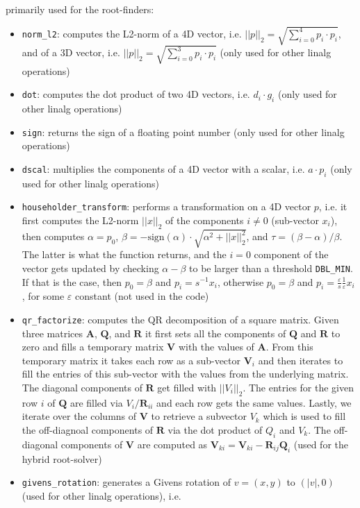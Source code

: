 \documentclass{article}
\newcommand{\var}[1]{%
  {\setlength{\fboxsep}{1.5pt}%
   \colorbox{varbg}{\textcolor{varfg}{\texttt{\small #1}}}}}
\begin{document}
primarily used for the root-finders:
\begin{itemize}
  \item \var{norm\_l2}: computes the L2-norm of a 4D vector, i.e. $||p||_2=\sqrt{\sum_{i=0}^{4}p_i\cdot p_i}$, and of a
  3D vector, i.e. $||p||_2=\sqrt{\sum_{i=0}^{3}p_i\cdot p_i}$ (only used for other linalg operations)
  \item \var{dot}: computes the dot product of two 4D vectors, i.e. $d_i\cdot g_i$ (only used for other linalg operations)
  \item \var{sign}: returns the sign of a floating point number (only used for other linalg operations)
  \item \var{dscal}: multiplies the components of a 4D vector with a scalar, i.e. $a\cdot p_i$ (only used for other
  linalg operations)
  \item \var{householder\_transform}: performs a transformation on a 4D vector $p$, i.e. it first computes the L2-norm $||x||_2$ of the components $i\neq 0$ (sub-vector $x_i$), then computes
  $\alpha=p_0$, $\beta=-\mathrm{sign}(\alpha)\cdot \sqrt{\alpha^2+||x||_2^2}$, and $\tau=(\beta-\alpha)/\beta$. The latter is what the function returns, and the $i=0$ component of
  the vector gets updated by checking $\alpha-\beta$ to be larger than a threshold \var{DBL\_MIN}. If that is the case, then $p_0=\beta$ and $p_i=s^{-1}x_i$, otherwise $p_0=\beta$ and $p_i=\frac{\varepsilon}{s}\frac{1}{\varepsilon}x_i$,
  for some $\varepsilon$ constant (not used in the code)
  \item \var{qr\_factorize}: computes the QR decomposition of a square matrix. Given three matrices $\mathbf{A}$, $\mathbf{Q}$, and $\mathbf{R}$ it first sets all the components of
  $\mathbf{Q}$ and $\mathbf{R}$ to zero and fills a temporary matrix $\mathbf{V}$ with the values of $\mathbf{A}$. From this temporary matrix it takes each row as a sub-vector $\mathbf{V}_i$ and then iterates
  to fill the entries of this sub-vector with the values from the underlying matrix. The diagonal components of $\mathbf{R}$ get filled with $||V_i||_2$. The entries for the given row $i$ of $\mathbf{Q}$ are filled via
  $V_i/\mathbf{R}_{ii}$ and each row gets the same values. Lastly, we iterate over the columns of $\mathbf{V}$ to retrieve a subvector $V_k$ which is used to fill the off-diagnoal components of $\mathbf{R}$ via
  the dot product of $Q_i$ and $V_k$. The off-diagonal components of $\mathbf{V}$ are computed as $\mathbf{V}_{ki}=\mathbf{V}_{ki}-\mathbf{R}_{ij}\mathbf{Q}_i$ (used for the hybrid root-solver)
  \item \var{givens\_rotation}: generates a Givens rotation of $v=(x,y)$ to $(|v|,0)$ (used for other linalg operations), i.e.

\end{itemize}
\end{document}
